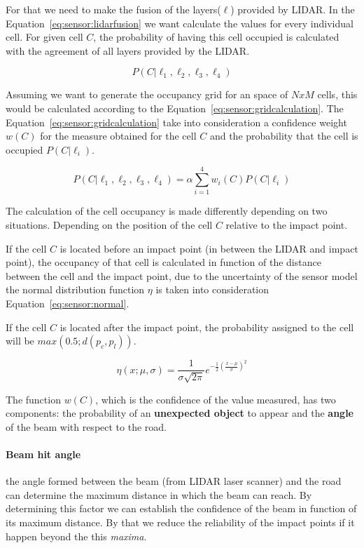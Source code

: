 For that we need to make the fusion of the layers($\ell$) provided by LIDAR. In the Equation~\ref{eq:sensor:lidarfusion} we want calculate the values for every individual cell. For given cell $C$, the probability of having this cell occupied is calculated with the agreement of all layers provided by the LIDAR.

\begin{equation}
\label{eq:sensor:lidarfusion}
P(C|\ell_1,\ell_2,\ell_3,\ell_4)
\end{equation}

Assuming we want to generate the occupancy grid for an space of $NxM$ cells, this would be calculated according to the Equation~\ref{eq:sensor:gridcalculation}. The Equation~\ref{eq:sensor:gridcalculation} take into consideration a confidence weight $w(C)$ for the measure obtained for the cell $C$ and the probability that the cell is occupied $P(C|\ell_i)$.

\begin{equation}
\label{eq:sensor:gridcalculation}
P(C|\ell_1,\ell_2,\ell_3,\ell_4)=\alpha \sum_{i=1}^{4} w_i(C)P(C|\ell_i)
\end{equation}

The calculation of the cell occupancy is made differently depending on two situations. Depending on the position of the cell $C$ relative to the impact point.

If the cell $C$ is located before an impact point (in between the LIDAR and impact point), the occupancy of that cell is calculated in function of the distance between the cell and the impact point, due to the uncertainty of the sensor model the normal distribution function $\eta$ is taken into consideration\cite{iyengar1991autonomous} Equation~\ref{eq:sensor:normal}.

If the cell $C$ is located after the impact point, the probability assigned to the cell will be $max(0.5;d(p_c,p_l))$.

\begin{equation}
\label{eq:sensor:normal}
\eta(x;\mu,\sigma)=\frac{1}{\sigma \sqrt{2\pi}}e^{-\frac{1}{2}(\frac{x-\mu}{\sigma})^2} 
\end{equation}

The function $w(C)$, which is the confidence of the value measured, has two components: the probability of an \textbf{unexpected object} to appear and the \textbf{angle} of the beam with respect to the road.

\paragraph*{Beam hit angle} the angle formed between the beam (from LIDAR laser scanner) and the road can determine the maximum distance in which the beam can reach. By determining this factor we can establish the confidence of the beam in function of its maximum distance. By that we reduce the reliability of the impact points if it happen beyond the this \textit{maxima}. 

